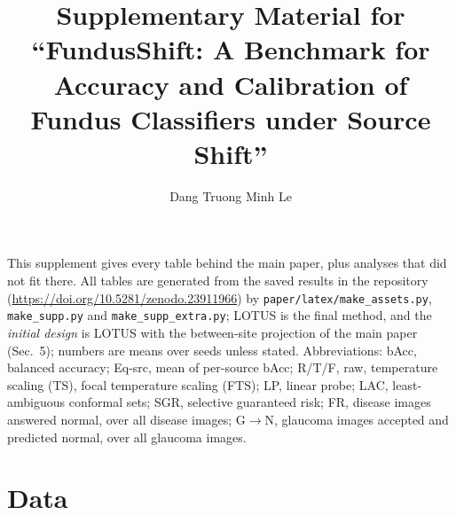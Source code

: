 \documentclass[runningheads]{llncs}
\begin{document}
\title{Supplementary Material for ``FundusShift: A Benchmark for Accuracy and Calibration of Fundus Classifiers under Source Shift''}
\author{Dang Truong Minh Le}
\maketitle

\noindent This supplement gives every table behind the main paper, plus analyses that did not fit there. All tables are generated from the saved results in the repository (\url{https://doi.org/10.5281/zenodo.23911966}) by \texttt{paper/latex/make\_assets.py}, \texttt{make\_supp.py} and \texttt{make\_supp\_extra.py}; LOTUS is the final method, and the \emph{initial design} is LOTUS with the between-site projection of the main paper (Sec.~5); numbers are means over seeds unless stated. Abbreviations: bAcc, balanced accuracy; Eq-src, mean of per-source bAcc; R/T/F, raw, temperature scaling (TS), focal temperature scaling (FTS); LP, linear probe; LAC, least-ambiguous conformal sets; SGR, selective guaranteed risk; FR, disease images answered normal, over all disease images; G$\to$N, glaucoma images accepted and predicted normal, over all glaucoma images.

\setcounter{tocdepth}{2}
\makeatletter\renewcommand*{}\makeatother
{\sloppy\tableofcontents}

\section{Data}\label{s:data}
\end{document}

